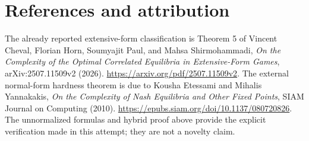 \documentclass[11pt]{article}
\begin{document}
\section*{References and attribution}
The already reported extensive-form classification is Theorem 5 of
Vincent Cheval, Florian Horn, Soumyajit Paul, and Mahsa Shirmohammadi,
\emph{On the Complexity of the Optimal Correlated Equilibria in
Extensive-Form Games}, arXiv:2507.11509v2 (2026).
\url{https://arxiv.org/pdf/2507.11509v2}.
The external normal-form hardness theorem is due to Kousha Etessami and
Mihalis Yannakakis, \emph{On the Complexity of Nash Equilibria and Other
Fixed Points}, SIAM Journal on Computing (2010).
\url{https://epubs.siam.org/doi/10.1137/080720826}.
The unnormalized formulas and hybrid proof above provide the explicit
verification made in this attempt; they are not a novelty claim.
\end{document}
